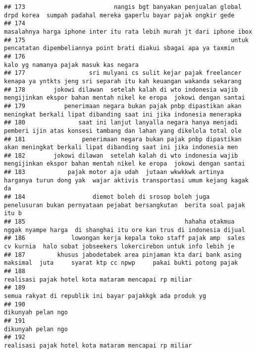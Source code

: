 \documentclass[
]{article}
\begin{document}
\begin{verbatim}
## 173                         nangis bgt banyakan penjualan global drpd korea  sumpah padahal mereka gaperlu bayar pajak ongkir gede  
## 174                                                          masalahnya harga iphone inter itu rata lebih murah jt dari iphone ibox 
## 175                                                          untuk pencatatan dipembeliannya point brati diakui sbagai apa ya taxmin
## 176                                                                                           kalo yg namanya pajak masuk kas negara
## 177                  sri mulyani cs sulit kejar pajak freelancer kenapa ya yntkts jeng sri separah itu kah keuangan wakanda sekarang
## 178        jokowi dilawan  setelah kalah di wto indonesia wajib mengijinkan ekspor bahan mentah nikel ke eropa  jokowi dengan santai
## 179           penerimaan negara bukan pajak pnbp dipastikan akan meningkat berkali lipat dibanding saat ini jika indonesia menerapka
## 180               saat ini lanjut lanyalla negara hanya menjadi pemberi ijin atas konsesi tambang dan lahan yang dikelola total ole 
## 181                penerimaan negara bukan pajak pnbp dipastikan akan meningkat berkali lipat dibanding saat ini jika indonesia men 
## 182        jokowi dilawan  setelah kalah di wto indonesia wajib mengijinkan ekspor bahan mentah nikel ke eropa  jokowi dengan santai
## 183            pajak motor aja udah  jutaan wkwkkwk artinya harganya turun dong yak  wajar aktivis transportasi umum kejang kagak da
## 184                   diemot boleh di srosop boleh juga  penelusuran bukan pernyataan pejabat bersangkutan  berita soal pajak itu b 
## 185                                             hahaha otakmua nggak nyampe harga  di shanghai itu ore kan trus di indonesia dijual 
## 186             lowongan kerja kepala toko staff pajak amp  sales cv kurnia  halo sobat jobseekers lokercirebon untuk info lebih je 
## 187         khusus jabodetabek area pinjaman kta dari bank asing maksimal  juta     syarat ktp cc npwp     pakai bukti potong pajak 
## 188                                                                           realisasi pajak hotel kota mataram mencapai rp miliar 
## 189                                                                       semua rakyat di republik ini bayar pajakkgk ada produk yg 
## 190                                                                                                         dikunyah pelan ngo      
## 191                                                                                                         dikunyah pelan ngo      
## 192                                                                           realisasi pajak hotel kota mataram mencapai rp miliar 

\end{verbatim}
\end{document}

